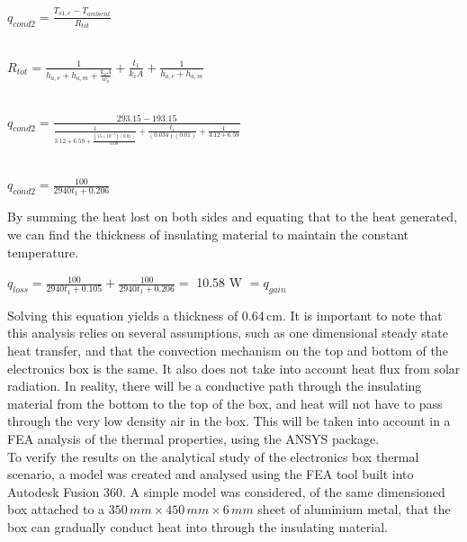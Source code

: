 \begin{center}
 $q_{cond2} = \frac{T_{s1,e}-T_{ambient}}{R_{tot}} $\\
 
 \ 
 
 $R_{tot} = \frac{1}{h_{a,e}+h_{a,m}+\frac{k_{a}A}{w_{a}}} + \frac{t_{1}}{k_{i}A} + \frac{1}{h_{a,e}+h_{a,m}}  $\\
 
 \
 \ 
 
 $q_{cond2} = \frac{293.15 - 193.15}{\frac{1}{3.12+6.59+\frac{(15\times10^{-3})(0.01)}{0.08}} + \frac{t_{1}}{(0.034)(0.01)} + \frac{1}{3.12+6.59}} $\\
 
 \  
 \ 
 
 $q_{cond2} = \frac{100}{2940t_{1}+0.206} $\\
 
\end{center}

By summing the heat lost on both sides and equating that to the heat generated, we can find the thickness of insulating material to maintain the constant temperature. \\

\begin{center}
 $q_{loss} = \frac{100}{2940t_{1}+0.105} + \frac{100}{2940t_{1}+0.206} =$ 
10.58 W
$= q_{gain} $\\
\end{center}

Solving this equation yields a thickness of 0.64\,cm. It is important to note that this analysis relies on several assumptions, such as one dimensional steady state heat transfer, and that the convection mechanism on the top and bottom of the electronics box is the same. It also does not take into account heat flux from solar radiation. In reality, there will be a conductive path through the insulating material from the bottom to the top of the box, and heat will not have to pass through the very low density air in the box. This will be taken into account in a FEA analysis of the thermal properties, using the ANSYS package. \\

To verify the results on the analytical study of the electronics box thermal scenario, a model was created and analysed using the FEA tool built into Autodesk Fusion 360. A simple model was considered, of the same dimensioned box attached to a $350 \,mm \times 450\,mm \times 6\,mm$ sheet of aluminium metal, that the box can gradually conduct heat into through the insulating material. \\

